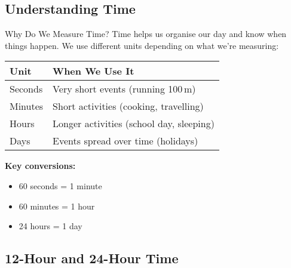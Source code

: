 \documentclass[12pt,a4paper]{article}
\begin{document}
\subsection{Understanding Time}

\begin{conceptbox}{Why Do We Measure Time?}
Time helps us organise our day and know when things happen. We use different units depending on what we're measuring:

\begin{center}
\begin{tabular}{ll}
\toprule
\textbf{Unit} & \textbf{When We Use It} \\
\midrule
Seconds & Very short events (running 100\,m) \\
Minutes & Short activities (cooking, travelling) \\
Hours & Longer activities (school day, sleeping) \\
Days & Events spread over time (holidays) \\
\bottomrule
\end{tabular}
\end{center}

\textbf{Key conversions:}
\begin{itemize}[leftmargin=*]
\item 60 seconds = 1 minute
\item 60 minutes = 1 hour
\item 24 hours = 1 day
\end{itemize}
\end{conceptbox}

\subsection{12-Hour and 24-Hour Time}
\end{document}
